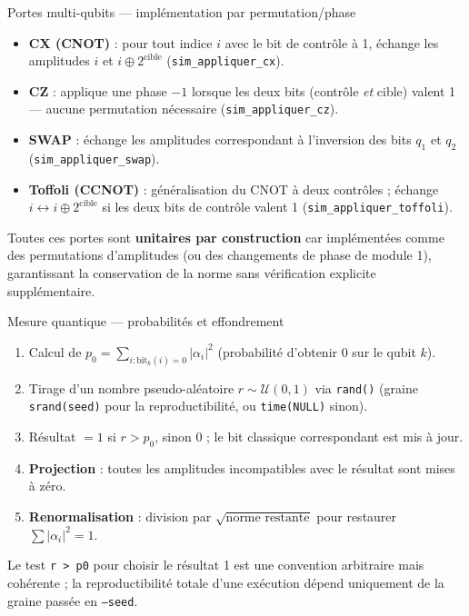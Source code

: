 \documentclass[10pt]{beamer}
\begin{document}
\begin{frame}{Portes multi-qubits --- implémentation par permutation/phase}
  \begin{itemize}
    \item \textbf{CX (CNOT)} : pour tout indice $i$ avec le bit de contrôle à 1, échange les amplitudes $i$ et $i \oplus 2^{\text{cible}}$ (\texttt{sim\_appliquer\_cx}).
    \item \textbf{CZ} : applique une phase $-1$ lorsque les deux bits (contrôle \emph{et} cible) valent 1 --- aucune permutation nécessaire (\texttt{sim\_appliquer\_cz}).
    \item \textbf{SWAP} : échange les amplitudes correspondant à l'inversion des bits $q_1$ et $q_2$ (\texttt{sim\_appliquer\_swap}).
    \item \textbf{Toffoli (CCNOT)} : généralisation du CNOT à deux contrôles ; échange $i \leftrightarrow i \oplus 2^{\text{cible}}$ si les deux bits de contrôle valent 1 (\texttt{sim\_appliquer\_toffoli}).
  \end{itemize}
  \begin{keybox}[title=Observation]
    Toutes ces portes sont \textbf{unitaires par construction} car implémentées comme des permutations d'amplitudes (ou des changements de phase de module 1), garantissant la conservation de la norme sans vérification explicite supplémentaire.
  \end{keybox}
\end{frame}

\begin{frame}{Mesure quantique --- probabilités et effondrement}
  \begin{enumerate}
    \item Calcul de $p_0 = \sum_{i : \text{bit}_k(i)=0} |\alpha_i|^2$ (probabilité d'obtenir 0 sur le qubit $k$).
    \item Tirage d'un nombre pseudo-aléatoire $r \sim \mathcal{U}(0,1)$ via \texttt{rand()} (graine \texttt{srand(seed)} pour la reproductibilité, ou \texttt{time(NULL)} sinon).
    \item Résultat $= 1$ si $r > p_0$, sinon $0$ ; le bit classique correspondant est mis à jour.
    \item \textbf{Projection} : toutes les amplitudes incompatibles avec le résultat sont mises à zéro.
    \item \textbf{Renormalisation} : division par $\sqrt{\text{norme restante}}$ pour restaurer $\sum|\alpha_i|^2 = 1$.
  \end{enumerate}
  \begin{warnbox}[title=Point d'attention identifié]
    Le test \texttt{r > p0} pour choisir le résultat 1 est une convention arbitraire mais cohérente ; la reproductibilité totale d'une exécution dépend uniquement de la graine passée en \texttt{--seed}.
  \end{warnbox}
\end{frame}
\end{document}
